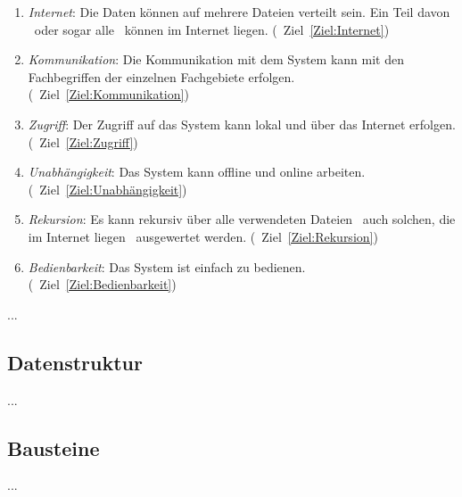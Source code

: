 \documentclass[english,ngerman,parskip=half,headsepline,footsepline]{scrreprt}
\begin{document}
\begin{enumerate}
		\item \label{Anforderung:Internet} \emph{Internet}: Die Daten können auf mehrere Dateien verteilt sein. Ein Teil davon \textendash\ oder sogar alle \textendash\ können im Internet liegen. (\seename\ Ziel~\vref{Ziel:Internet})

		\item \label{Anforderung:Kommunikation} \emph{Kommunikation}: Die Kommunikation mit dem System kann mit den Fachbegriffen der einzelnen Fachgebiete erfolgen. (\seename\ Ziel~\vref{Ziel:Kommunikation})

		\item \label{Anforderung:Zugriff} \emph{Zugriff}: Der Zugriff auf das System kann lokal und über das Internet erfolgen. (\seename\ Ziel~\vref{Ziel:Zugriff})

		\item \label{Anforderung:Unabhängigkeit} \emph{Unabhängigkeit}: Das System kann offline und online arbeiten. (\seename\ Ziel~\vref{Ziel:Unabhängigkeit})

		\item \label{Anforderung:Rekursion} \emph{Rekursion}: Es kann rekursiv über alle verwendeten Dateien \textendash\ auch solchen, die im Internet liegen \textendash\ ausgewertet werden. (\seename\ Ziel~\vref{Ziel:Rekursion})

		\item \label{Anforderung:Bedienbarkeit} \emph{Bedienbarkeit}: Das System ist einfach zu bedienen. (\seename\ Ziel~\vref{Ziel:Bedienbarkeit})

	\end{enumerate}

	... %

	\section{Datenstruktur}
	\label{Datenstruktur}

	... %

	\section{Bausteine}
	\label{Bausteine}

	... %

	\appendix
	\chapter{\appendixname} %
	
\end{document}

